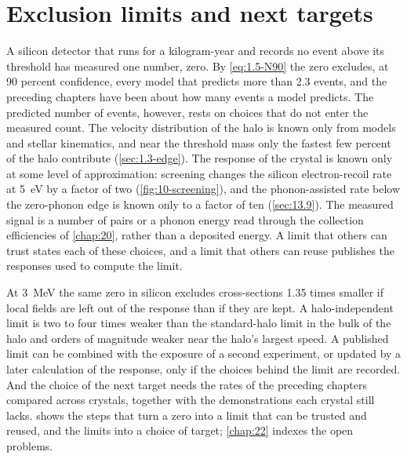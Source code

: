 \chapter{Exclusion limits and next targets}\label{chap:21}
A silicon detector that runs for a kilogram-year and records no event above its threshold has measured one number, zero. By \cref{eq:1.5-N90} the zero excludes, at 90 percent confidence, every model that predicts more than 2.3 events, and the preceding chapters have been about how many events a model predicts. The predicted number of events, however, rests on choices that do not enter the measured count. The velocity distribution of the halo is known only from models and stellar kinematics, and near the threshold mass only the fastest few percent of the halo contribute (\cref{sec:1.3-edge}). The response of the crystal is known only at some level of approximation: screening changes the silicon electron-recoil rate at \SI{5}{eV} by a factor of two (\cref{fig:10-screening}), and the phonon-assisted rate below the zero-phonon edge is known only to a factor of ten (\cref{sec:13.9}). The measured signal is a number of pairs or a phonon energy read through the collection efficiencies of \cref{chap:20}, rather than a deposited energy. A limit that others can trust states each of these choices, and a limit that others can reuse publishes the responses used to compute the limit.

At \SI{3}{MeV} the same zero in silicon excludes cross-sections 1.35 times smaller if local fields are left out of the response than if they are kept. A halo-independent limit is two to four times weaker than the standard-halo limit in the bulk of the halo and orders of magnitude weaker near the halo's largest speed. A published limit can be combined with the exposure of a second experiment, or updated by a later calculation of the response, only if the choices behind the limit are recorded. And the choice of the next target needs the rates of the preceding chapters compared across crystals, together with the demonstrations each crystal still lacks.  shows the steps that turn a zero into a limit that can be trusted and reused, and the limits into a choice of target; \cref{chap:22} indexes the open problems.

